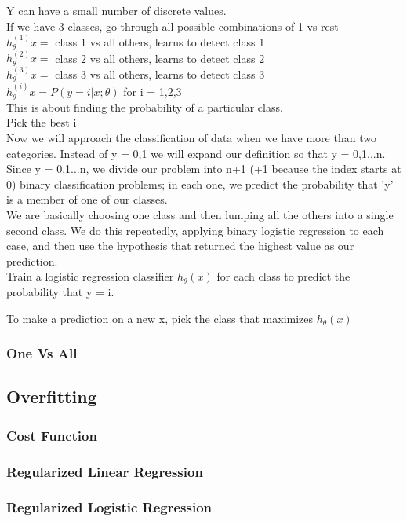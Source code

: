   Y can have a small number of discrete values.\\

  If we have 3 classes, go through all possible combinations of 1 vs rest\\
  $h_{\theta}^{(1)}{x} = $ class 1 vs all others, learns to detect class 1\\
  $h_{\theta}^{(2)}{x} = $ class 2 vs all others, learns to detect class 2\\
  $h_{\theta}^{(3)}{x} = $ class 3 vs all others, learns to detect class 3\\
  $h_{\theta}^{(i)}{x} = P(y=i|x;\theta)$ for i = 1,2,3\\
  This is about finding the probability of a particular class.\\
  Pick the best i\\
  
  
Now we will approach the classification of data when we have more than two categories. Instead of y = {0,1} we will expand our definition so that y = {0,1...n}. \\

Since y = {0,1...n}, we divide our problem into n+1 (+1 because the index starts at 0) binary classification problems; in each one, we predict the probability that 'y' is a member of one of our classes.\\

We are basically choosing one class and then lumping all the others into a single second class. We do this repeatedly, applying binary logistic regression to each case, and then use the hypothesis that returned the highest value as our prediction.\\

Train a logistic regression classifier $h_\theta(x)$ for each class to predict the probability that y = i.

To make a prediction on a new x, pick the class that maximizes $h_\theta (x)$

  \subsubsection{One Vs All}
  
  \subsection{Overfitting}
  \subsubsection{Cost Function}
  \subsubsection{Regularized Linear Regression}
  \subsubsection{Regularized Logistic Regression}
  

